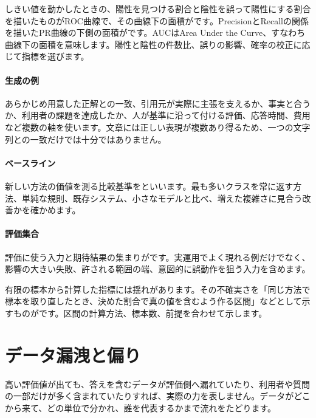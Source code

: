         しきい値を動かしたときの、陽性を見つける割合と陰性を誤って陽性にする割合を描いたものがROC曲線で、その曲線下の面積がです。PrecisionとRecallの関係を描いたPR曲線の下側の面積がです。AUCはArea Under the Curve、すなわち曲線下の面積を意味します。陽性と陰性の件数比、誤りの影響、確率の校正に応じて指標を選びます。

\paragraph{生成の例}
        あらかじめ用意した正解との一致、引用元が実際に主張を支えるか、事実と合うか、利用者の課題を達成したか、人が基準に沿って付ける評価、応答時間、費用など複数の軸を使います。文章には正しい表現が複数あり得るため、一つの文字列との一致だけでは十分ではありません。

\par
\endgroup
\medskip
\begingroup
\paragraph{ベースライン}
        新しい方法の価値を測る比較基準をといいます。最も多いクラスを常に返す方法、単純な規則、既存システム、小さなモデルと比べ、増えた複雑さに見合う改善かを確かめます。

\paragraph{評価集合}
        評価に使う入力と期待結果の集まりがです。実運用でよく現れる例だけでなく、影響の大きい失敗、許される範囲の端、意図的に誤動作を狙う入力を含めます。

        有限の標本から計算した指標には揺れがあります。その不確実さを「同じ方法で標本を取り直したとき、決めた割合で真の値を含むよう作る区間」などとして示すものがです。区間の計算方法、標本数、前提を合わせて示します。

\par
\endgroup
\par
\endgroup


\section{データ漏洩と偏り}
\label{sec:06-machine-learning-32}

高い評価値が出ても、答えを含むデータが評価側へ漏れていたり、利用者や質問の一部だけが多く含まれていたりすれば、実際の力を表しません。データがどこから来て、どの単位で分かれ、誰を代表するかまで流れをたどります。

